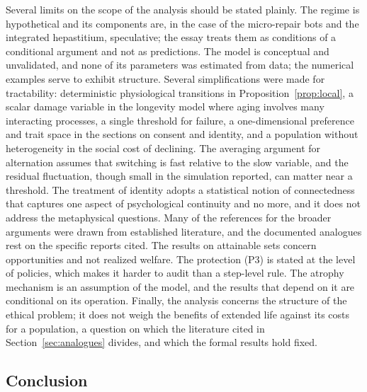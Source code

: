 \documentclass[11pt]{article}
\theoremstyle{plain}
\theoremstyle{definition}
\theoremstyle{remark}
\begin{document}
Several limits on the scope of the analysis should be stated plainly. The regime is hypothetical and its components are, in the case of the micro-repair bots and the integrated hepastitium, speculative; the essay treats them as conditions of a conditional argument and not as predictions. The model is conceptual and unvalidated, and none of its parameters was estimated from data; the numerical examples serve to exhibit structure. Several simplifications were made for tractability: deterministic physiological transitions in Proposition~\ref{prop:local}, a scalar damage variable in the longevity model where aging involves many interacting processes, a single threshold for failure, a one-dimensional preference and trait space in the sections on consent and identity, and a population without heterogeneity in the social cost of declining. The averaging argument for alternation assumes that switching is fast relative to the slow variable, and the residual fluctuation, though small in the simulation reported, can matter near a threshold. The treatment of identity adopts a statistical notion of connectedness that captures one aspect of psychological continuity and no more, and it does not address the metaphysical questions. Many of the references for the broader arguments were drawn from established literature, and the documented analogues rest on the specific reports cited. The results on attainable sets concern opportunities and not realized welfare. The protection (P3) is stated at the level of policies, which makes it harder to audit than a step-level rule. The atrophy mechanism is an assumption of the model, and the results that depend on it are conditional on its operation. Finally, the analysis concerns the structure of the ethical problem; it does not weigh the benefits of extended life against its costs for a population, a question on which the literature cited in Section~\ref{sec:analogues} divides, and which the formal results hold fixed.

\subsection{Conclusion}
\end{document}
